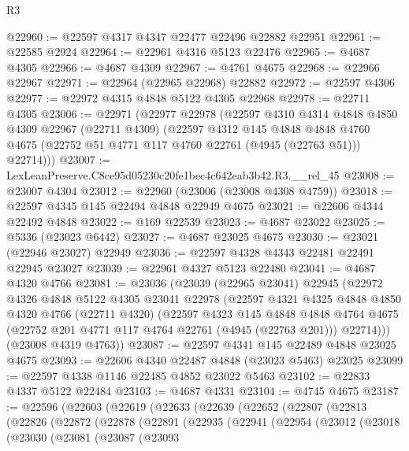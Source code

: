 \begin{lexlean}{R3}
\begin{coremodule}
@22960 := @22597 @4317 @4347 @22477 @22496 @22882 @22951
@22961 := @22585 @2924
@22964 := @22961 @4316 @5123 @22476
@22965 := @4687 @4305
@22966 := @4687 @4309
@22967 := @4761 @4675
@22968 := @22966 @22967
@22971 := @22964 (@22965 @22968) @22882
@22972 := @22597 @4306
@22977 := @22972 @4315 @4848 @5122 @4305 @22968
@22978 := @22711 @4305
@23006 := @22971
    (@22977
      @22978
      (@22597
        @4310
        @4314
        @4848
        @4850
        @4309
        @22967
        (@22711 @4309)
        (@22597
          @4312
          @145
          @4848
          @4848
          @4760
          @4675
          (@22752 @51 @4771 @117 @4760 @22761 (@4945 (@22763 @51)))
          @22714)))
@23007 := LexLeanPreserve.C8ce95d05230c20fe1bec4c642eab3b42.R3.__rel_45
@23008 := @23007 @4304
@23012 := @22960 (@23006 (@23008 @4308 @4759))
@23018 := @22597 @4345 @145 @22494 @4848 @22949 @4675
@23021 := @22606 @4344 @22492 @4848
@23022 := @169 @22539
@23023 := @4687 @23022
@23025 := @5336 (@23023 @6442)
@23027 := @4687 @23025 @4675
@23030 := @23021 (@22946 @23027) @22949
@23036 := @22597 @4328 @4343 @22481 @22491 @22945 @23027
@23039 := @22961 @4327 @5123 @22480
@23041 := @4687 @4320 @4766
@23081 := @23036
    (@23039
      (@22965 @23041)
      @22945
      (@22972
        @4326
        @4848
        @5122
        @4305
        @23041
        @22978
        (@22597
          @4321
          @4325
          @4848
          @4850
          @4320
          @4766
          (@22711 @4320)
          (@22597
            @4323
            @145
            @4848
            @4848
            @4764
            @4675
            (@22752 @201 @4771 @117 @4764 @22761 (@4945 (@22763 @201)))
            @22714)))
      (@23008 @4319 @4763))
@23087 := @22597 @4341 @145 @22489 @4848 @23025 @4675
@23093 := @22606 @4340 @22487 @4848 (@23023 @5463) @23025
@23099 := @22597 @4338 @1146 @22485 @4852 @23022 @5463
@23102 := @22833 @4337 @5122 @22484
@23103 := @4687 @4331
@23104 := @4745 @4675
@23187 := @22596
    (@22603
      (@22619
        (@22633
          (@22639
            (@22652
              (@22807
                (@22813
                  (@22826
                    (@22872
                      (@22878
                        (@22891
                          (@22935
                            (@22941
                              (@22954
                                (@23012
                                  (@23018
                                    (@23030
                                      (@23081
                                        (@23087
                                          (@23093

\end{coremodule}
\end{lexlean}
